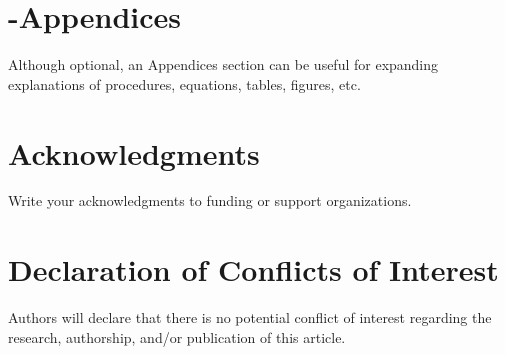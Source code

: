 \documentclass[letterpaper]{EmergentUDB}
\begin{document}
\part{-Appendices}
Although optional, an Appendices section can be useful for expanding explanations of procedures, equations, tables, figures, etc.

\part{Acknowledgments}
Write your acknowledgments to funding or support organizations.

\part{Declaration of Conflicts of Interest}
Authors will declare that there is no potential conflict of interest regarding the research, authorship, and/or publication of this article.



\printbibliography

\end{document}
